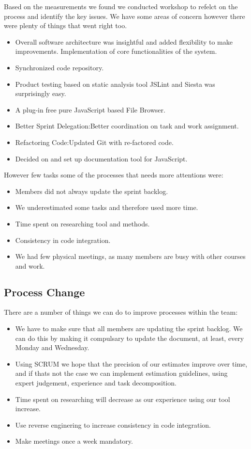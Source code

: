 Based on the measurements we found we conducted workshop to refelct on the process and identify the key issues. We have  some areas of concern however there were plenty of things that went right too.

\begin{itemize}
	\item	Overall software architecture was insightful and added flexibility to make improvements. Implementation of core functionalities of  the system.
	\item	Synchronized code repository.
	\item	Product testing based on static analysis tool JSLint and Siesta was surprisingly easy.
	\item	A plug-in free pure JavaScript based File Browser.
	\item	Better Sprint Delegation:Better coordination on task and work assignment.
	\item	Refactoring Code:Updated Git with re-factored code.
	\item	Decided on and set up documentation tool for JavaScript.
\end{itemize}

However few tasks some of the processes that needs more attentions were:
\begin{itemize}
	\item Members did not always update the sprint backlog.
	\item We underestimated some tasks and therefore used more time.
	\item Time spent on researching tool and methods.
	\item Consistency in code integration.
	\item We had few physical meetings, as many members are busy with other courses and work.
\end{itemize}

\subsection{Process Change}
There are a number of things we can do to improve processes within the team:
\begin{itemize}
	\item We have to make sure that all members are updating the sprint backlog. We can do this by making it compulsary to update the document, at least, every Monday and Wednesday.
	\item Using SCRUM we hope that the precision of our estimates improve over time, and if thats not the case we can implement estimation guidelines, using expert judgement, experience and task decomposition.
	\item Time spent on researching will decrease as our experience using our tool increase.
	\item Use reverse enginering to increase consistency in code integration.
	\item Make meetings once a week mandatory.
\end{itemize}

